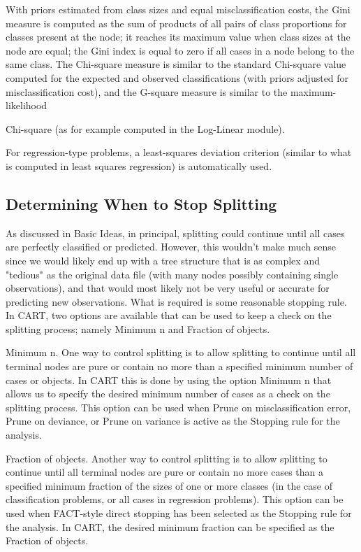 With priors estimated from class sizes and equal misclassification costs, the Gini measure is computed as the sum of products of all pairs of class proportions for classes present at the node; it reaches its maximum value when class sizes at the node are equal; the Gini index is equal to zero if all cases in a node belong to the same class. The Chi-square measure is similar to the standard Chi-square value computed for the expected and observed classifications (with priors adjusted for misclassification cost), and the G-square measure is similar to the maximum-likelihood 

Chi-square (as for example computed in the Log-Linear module).

For regression-type problems, a least-squares deviation criterion (similar to what is computed in least squares regression) is automatically used. 

\subsection{Determining When to Stop Splitting}

As discussed in Basic Ideas, in principal, splitting could continue until all cases are perfectly classified or predicted. However, this wouldn't make much sense since we would likely end up with a tree structure that is as complex and "tedious" as the original data file (with many nodes possibly containing single observations), and that would most likely not be very useful or accurate for predicting new observations. What is required is some reasonable stopping rule. In CART, two options are available that can be used to keep a check on the splitting process; namely Minimum n and Fraction of objects.

Minimum n. One way to control splitting is to allow splitting to continue until all terminal nodes are pure or contain no more than a specified minimum number of cases or objects. In CART this is done by using the option Minimum n that allows us to specify the desired minimum number of cases as a check on the splitting process. This option can be used when Prune on misclassification error, Prune on deviance, or Prune on variance is active as the Stopping rule for the analysis.

Fraction of objects. Another way to control splitting is to allow splitting to continue until all terminal nodes are pure or contain no more cases than a specified minimum fraction of the sizes of one or more classes (in the case of classification problems, or all cases in regression problems). This option can be used when FACT-style direct stopping has been selected as the Stopping rule for the analysis. In CART, the desired minimum fraction can be specified as the Fraction of objects.

